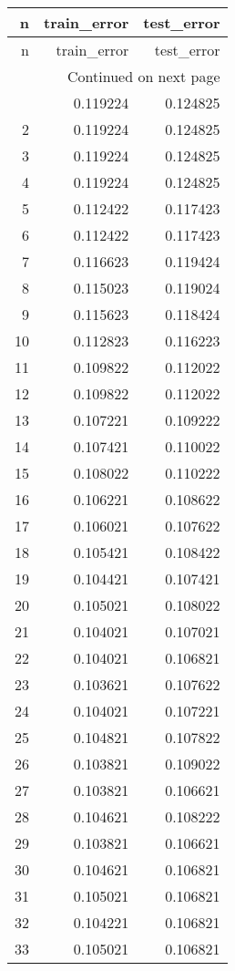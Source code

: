 \begin{longtable}{rrr}
\toprule
n & train_error & test_error \\
\midrule
\endfirsthead
\toprule
n & train_error & test_error \\
\midrule
\endhead
\midrule
\multicolumn{3}{r}{Continued on next page} \\
\midrule
\endfoot
\bottomrule
\endlastfoot
1 & 0.119224 & 0.124825 \\
2 & 0.119224 & 0.124825 \\
3 & 0.119224 & 0.124825 \\
4 & 0.119224 & 0.124825 \\
5 & 0.112422 & 0.117423 \\
6 & 0.112422 & 0.117423 \\
7 & 0.116623 & 0.119424 \\
8 & 0.115023 & 0.119024 \\
9 & 0.115623 & 0.118424 \\
10 & 0.112823 & 0.116223 \\
11 & 0.109822 & 0.112022 \\
12 & 0.109822 & 0.112022 \\
13 & 0.107221 & 0.109222 \\
14 & 0.107421 & 0.110022 \\
15 & 0.108022 & 0.110222 \\
16 & 0.106221 & 0.108622 \\
17 & 0.106021 & 0.107622 \\
18 & 0.105421 & 0.108422 \\
19 & 0.104421 & 0.107421 \\
20 & 0.105021 & 0.108022 \\
21 & 0.104021 & 0.107021 \\
22 & 0.104021 & 0.106821 \\
23 & 0.103621 & 0.107622 \\
24 & 0.104021 & 0.107221 \\
25 & 0.104821 & 0.107822 \\
26 & 0.103821 & 0.109022 \\
27 & 0.103821 & 0.106621 \\
28 & 0.104621 & 0.108222 \\
29 & 0.103821 & 0.106621 \\
30 & 0.104621 & 0.106821 \\
31 & 0.105021 & 0.106821 \\
32 & 0.104221 & 0.106821 \\
33 & 0.105021 & 0.106821 \\

\end{longtable}
